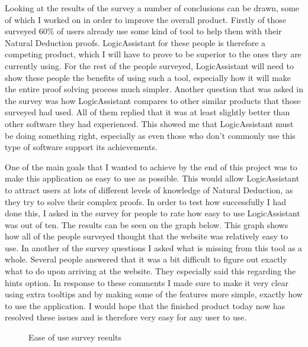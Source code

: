 Looking at the results of the survey a number of conclusions can be drawn, some of which I worked on in order to improve the overall product. Firstly of those surveyed 60\% of users already use some kind of tool to help them with their Natural Deduction proofs. LogicAssistant for these people is therefore a competing product, which I will have to prove to be superior to the ones they are currently using. For the rest of the people surveyed, LogicAssistant will need to show these people the benefits of using such a tool, especially how it will make the entire proof solving process much simpler. Another question that was asked in the survey was how LogicAssistant compares to other similar products that those surveyed had used. All of them replied that it was at least slightly better than other software they had experienced. This showed me that LogicAssistant must be doing something right, especially as even those who don't commonly use this type of software support its achievements.

One of the main goals that I wanted to achieve by the end of this project was to make this application as easy to use as possible. This would allow LogicAssistant to attract users at lots of different levels of knowledge of Natural Deduction, as they try to solve their complex proofs. In order to test how successfully I had done this, I asked in the survey for people to rate how easy to use LogicAssistant was out of ten. The results can be seen on the graph below. This graph shows how all of the people surveyed thought that the website was relatively easy to use. In another of the survey questions I asked what is missing from this tool as a whole. Several people answered that it was a bit difficult to figure out exactly what to do upon arriving at the website. They especially said this regarding the hints option. In response to these comments I made sure to make it very clear using extra tooltips and by making some of the features more simple, exactly how to use the application. I would hope that the finished product today now has resolved these issues and is therefore very easy for any user to use.

\begin{figure}[!ht]
	\centering
	\caption{Ease of use survey results}
\end{figure}

